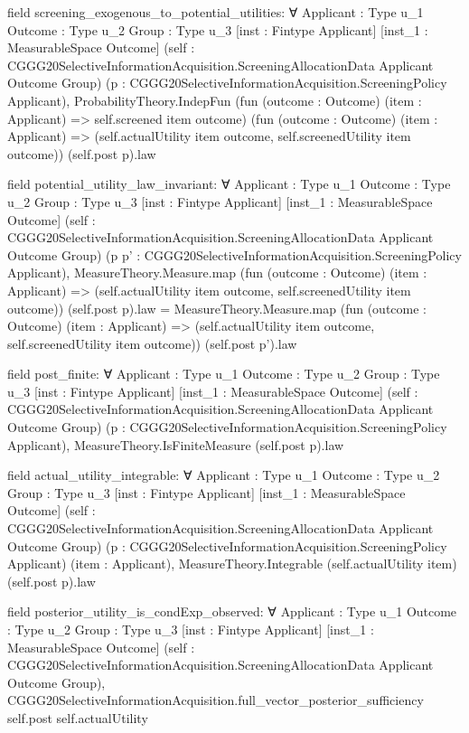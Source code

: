 \documentclass[10pt]{article}
\begin{document}
\begin{ReviewVerbatim}
field screening_exogenous_to_potential_utilities:
∀ {Applicant : Type u_1} {Outcome : Type u_2} {Group : Type u_3} [inst : Fintype Applicant]
  [inst_1 : MeasurableSpace Outcome]
  (self : CGGG20SelectiveInformationAcquisition.ScreeningAllocationData Applicant Outcome Group)
  (p : CGGG20SelectiveInformationAcquisition.ScreeningPolicy Applicant),
  ProbabilityTheory.IndepFun (fun (outcome : Outcome) (item : Applicant) => self.screened item outcome)
    (fun (outcome : Outcome) (item : Applicant) => (self.actualUtility item outcome, self.screenedUtility item outcome))
    (self.post p).law

field potential_utility_law_invariant:
∀ {Applicant : Type u_1} {Outcome : Type u_2} {Group : Type u_3} [inst : Fintype Applicant]
  [inst_1 : MeasurableSpace Outcome]
  (self : CGGG20SelectiveInformationAcquisition.ScreeningAllocationData Applicant Outcome Group)
  (p p' : CGGG20SelectiveInformationAcquisition.ScreeningPolicy Applicant),
  MeasureTheory.Measure.map
      (fun (outcome : Outcome) (item : Applicant) =>
        (self.actualUtility item outcome, self.screenedUtility item outcome))
      (self.post p).law =
    MeasureTheory.Measure.map
      (fun (outcome : Outcome) (item : Applicant) =>
        (self.actualUtility item outcome, self.screenedUtility item outcome))
      (self.post p').law

field post_finite:
∀ {Applicant : Type u_1} {Outcome : Type u_2} {Group : Type u_3} [inst : Fintype Applicant]
  [inst_1 : MeasurableSpace Outcome]
  (self : CGGG20SelectiveInformationAcquisition.ScreeningAllocationData Applicant Outcome Group)
  (p : CGGG20SelectiveInformationAcquisition.ScreeningPolicy Applicant), MeasureTheory.IsFiniteMeasure (self.post p).law

field actual_utility_integrable:
∀ {Applicant : Type u_1} {Outcome : Type u_2} {Group : Type u_3} [inst : Fintype Applicant]
  [inst_1 : MeasurableSpace Outcome]
  (self : CGGG20SelectiveInformationAcquisition.ScreeningAllocationData Applicant Outcome Group)
  (p : CGGG20SelectiveInformationAcquisition.ScreeningPolicy Applicant) (item : Applicant),
  MeasureTheory.Integrable (self.actualUtility item) (self.post p).law

field posterior_utility_is_condExp_observed:
∀ {Applicant : Type u_1} {Outcome : Type u_2} {Group : Type u_3} [inst : Fintype Applicant]
  [inst_1 : MeasurableSpace Outcome]
  (self : CGGG20SelectiveInformationAcquisition.ScreeningAllocationData Applicant Outcome Group),
  CGGG20SelectiveInformationAcquisition.full_vector_posterior_sufficiency self.post self.actualUtility
\end{ReviewVerbatim}
\end{document}
